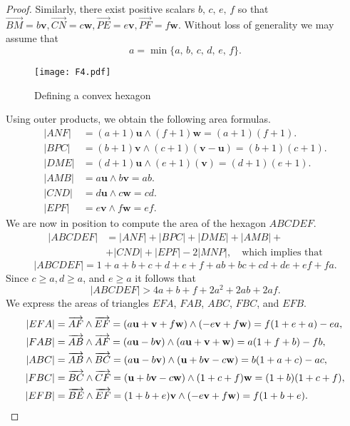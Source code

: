 \documentclass [10pt,oneside]{amsart}
\theoremstyle{definition}
\theoremstyle{plain}
\begin{document}
\begin{proof}
Similarly, there exist positive scalars $b,\,c,\,e,\,f$ so that
$\overrightarrow{BM}=b\mathbf{v},
\overrightarrow{CN}=c\mathbf{w},
\overrightarrow{PE}=e\mathbf{v},
\overrightarrow{PF}=f\mathbf{w}$. Without loss of generality we may assume that
\begin{equation}\label{assumeamin}
a=\min \{a,\,b,\,c,\,d,\,e,\,f\}.
\end{equation}
\begin{figure}[ht]
\centering
\texttt{[image: F4.pdf]}
\vspace{-0.5cm}
\caption{\small{Defining a convex hexagon}}
\label{fig4}
\end{figure}
Using outer products, we obtain the following area formulas.
\begin{align*}
|ANF|&=(a+1)\mathbf{u}\wedge (f+1)\mathbf{w}=(a+1)(f+1).\\
|BPC|&=(b+1)\mathbf{v}\wedge
(c+1)(\mathbf{v}-\mathbf{u})=(b+1)(c+1).\\
|DME|&=(d+1)\mathbf{u}\wedge (e+1)(\mathbf{v})=(d+1)(e+1).\\
|AMB|&= a\mathbf{u}\wedge b\mathbf{v}=ab.\\
|CND|&= d\mathbf{u}\wedge c\mathbf{w}=cd.\\
|EPF|&= e\mathbf{v}\wedge f\mathbf{w}=ef.
\end{align*}
We are now in position to compute the area of the hexagon $ABCDEF$.
\begin{align*}
|ABCDEF|&=|ANF|+|BPC|+|DME|+|AMB|+\\
&+|CND|+|EPF|-2|MNP|,\quad {\text{which implies
that}}
\end{align*}
\begin{equation}\label{hex}
|ABCDEF|=1+a+b+c+d+e+f+ab+bc+cd+de+ef+fa.
\end{equation}
Since $c\ge a, d\ge a$, and $e\ge a$ it follows that
\begin{equation}\label{boundhex}
|ABCDEF|> 4a+b+f+2a^2+2ab+2af.
\end{equation}
We express the areas of triangles $EFA$, $FAB$, $ABC$, $FBC$, and $EFB$.
\begin{align}\label{fivetriangles}
|EFA|&=\overrightarrow{AF}\wedge \overrightarrow{EF}=(a\mathbf{u}+\mathbf{v}+f\mathbf{w})\wedge (-e\mathbf{v}+f\mathbf{w})=f(1+e+a)-ea,\notag\\
|FAB|&=\overrightarrow{AB}\wedge \overrightarrow{AF}=(a\mathbf{u}-b\mathbf{v})\wedge (a\mathbf{u}+\mathbf{v}+\mathbf{w})=a(1+f+b)-fb,\notag\\
|ABC|&=\overrightarrow{AB}\wedge \overrightarrow{BC}=(a\mathbf{u}-b\mathbf{v})\wedge (\mathbf{u}+b\mathbf{v}-c\mathbf{w})=b(1+a+c)-ac,\\
|FBC|&=\overrightarrow{BC}\wedge \overrightarrow{CF}=(\mathbf{u}+b\mathbf{v}-c\mathbf{w})\wedge (1+c+f)\mathbf{w}=(1+b)(1+c+f),\notag\\
|EFB|&=\overrightarrow{BE}\wedge \overrightarrow{EF}=(1+b+e)\mathbf{v}\wedge (-e\mathbf{v}+f\mathbf{w})=f(1+b+e).\notag
\end{align}


\end{proof}
\end{document}
